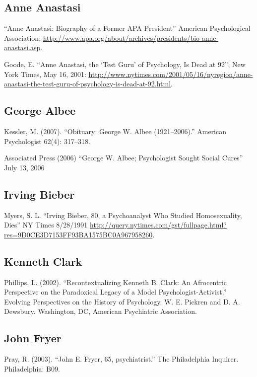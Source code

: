 \begin{refsection}
\begin{appendices}
\subsection{Anne Anastasi}
\label{anneanastasi}

“Anne Anastasi: Biography of a Former APA President” American Psychological Association: \url{http://www.apa.org/about/archives/presidents/bio-anne-anastasi.asp}.

Goode, E. “Anne Anastasi, the `Test Guru' of Psychology, Is Dead at 92”, New York Times, May 16, 2001: \url{http://www.nytimes.com/2001/05/16/nyregion/anne-anastasi-the-test-guru-of-psychology-is-dead-at-92.html}.

\subsection{George Albee}
\label{georgealbee}

Kessler, M. (2007). ``Obituary: George W. Albee (1921--2006).'' American Psychologist 62(4): 317--318. 

Associated Press (2006) “George W. Albee; Psychologist Sought Social Cures” July 13, 2006

\subsection{Irving Bieber}
\label{irvingbieber}

Myers, S. L. “Irving Bieber, 80, a Psychoanalyst Who Studied Homosexuality, Dies” NY Times 8\slash 28\slash 1991 \url{http://query.nytimes.com/gst/fullpage.html?res=9D0CE3D7153FF93BA1575BC0A967958260}.

\subsection{Kenneth Clark}
\label{kennethclark}

Phillips, L. (2002). “Recontextualizing Kenneth B. Clark: An Afrocentric Perspective on the Paradoxical Legacy of a Model Psychologist-Activist.” Evolving Perspectives on the History of Psychology. W. E. Pickren and D. A. Dewsbury. Washington, DC, American Psychiatric Association. 

\subsection{John Fryer}
\label{johnfryer}

Pray, R. (2003). “John E. Fryer, 65, psychiatrist.” The Philadelphia Inquirer. Philadelphia: B09.


\end{appendices}
\end{refsection}
